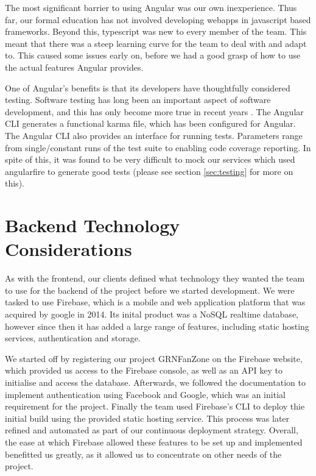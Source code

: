 \documentclass{l3proj}
\begin{document}
The most significant barrier to using Angular was our own inexperience.
 Thus far, our formal education has not involved developing webapps in
 javascript based frameworks. Beyond this, typescript was new to every
 member of the team. This meant that there was a steep learning curve for
 the team to deal with and adapt to. This caused some issues early on,
 before we had a good grasp of how to use the actual features Angular
 provides.

One of Angular's benefits is that its developers have thoughtfully
 considered testing. Software testing has long been an important
 aspect of software development, and this has only become more true
 in recent years \cite{tuteja2012testing}. The Angular CLI generates
 a functional karma file, which has been configured for Angular. The
 Angular CLI also provides an interface for running tests. Parameters
 range from single/constant runs of the test suite to enabling code
 coverage reporting. In spite of this, it was found to be very
 difficult to mock our services which used angularfire to generate
 good tests (please see section \ref{sec:testing} for more on this).



\section{Backend Technology Considerations}
\label{sec:backend}

As with the frontend, our clients defined what technology they wanted the team
 to use for the backend of the project before we started development. We were
 tasked to use Firebase, which is a mobile and web application platform that
 was acquired by google in 2014. Its inital product was a NoSQL realtime database,
 however since then it has added a large range of features, including static
 hosting services, authentication and storage.

We started off by registering our project GRNFanZone on the Firebase website,
 which provided us access to the Firebase console, as well as an API key to
 initialise and access the database. Afterwards, we followed the documentation
 to implement authentication using Facebook and Google, which was an initial
 requirement for the project. Finally the team used Firebase's CLI to deploy
 thie initial build using the provided static hosting service. This process
 was later refined and automated as part of our continuous deployment strategy.
 Overall, the ease at which Firebase allowed these features to be set up and
 implemented benefitted us greatly, as it allowed us to concentrate on other
 needs of the project.
\end{document}

